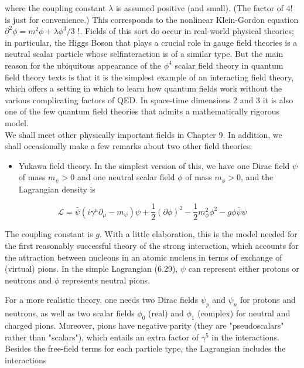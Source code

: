 \documentclass[10pt, letterpaper]{article}
\begin{document}
where the coupling constant $\lambda$ is assumed positive (and small). (The factor of $4!$ is just for convenience.) This corresponds to the nonlinear Klein-Gordon equation $\partial^{2} \phi=m^{2} \phi+\lambda \phi^{3} / 3$ !. Fields of this sort do occur in real-world physical theories; in particular, the Higgs Boson that plays a crucial role in gauge field theories is a neutral scalar particle whose selfinteraction is of a similar type. But the main reason for the ubiquitous appearance of the $\phi^{4}$ scalar field theory in quantum field theory texts is that it is the simplest example of an interacting field theory, which offers a setting in which to learn how quantum fields work without the various complicating factors of QED. In space-time dimensions 2 and 3 it is also one of the few quantum field theories that admits a mathematically rigorous model.\\
We shall meet other physically important fields in Chapter 9. In addition, we shall occasionally make a few remarks about two other field theories:

\begin{itemize}
  \item Yukawa field theory. In the simplest version of this, we have one Dirac field $\psi$ of mass $m_{\psi}>0$ and one neutral scalar field $\phi$ of mass $m_{\phi}>0$, and the Lagrangian density is
\end{itemize}

$$
\mathcal{L}=\bar{\psi}\left(i \gamma^{\mu} \partial_{\mu}-m_{\psi}\right) \psi+\frac{1}{2}(\partial \phi)^{2}-\frac{1}{2} m_{\phi}^{2} \phi^{2}-g \phi \bar{\psi} \psi
$$

The coupling constant is $g$. With a little elaboration, this is the model needed for the first reasonably successful theory of the strong interaction, which accounts for the attraction between nucleons in an atomic nucleus in terms of exchange of (virtual) pions. In the simple Lagrangian (6.29), $\psi$ can represent either protons or neutrons and $\phi$ represents neutral pions.

For a more realistic theory, one needs two Dirac fields $\psi_{p}$ and $\psi_{n}$ for protons and neutrons, as well as two scalar fields $\phi_{0}$ (real) and $\phi_{1}$ (complex) for neutral and charged pions. Moreover, pions have negative parity (they are "pseudoscalars" rather than "scalars"), which entails an extra factor of $\gamma^{5}$ in the interactions. Besides the free-field terms for each particle type, the Lagrangian includes the interactions
\end{document}
